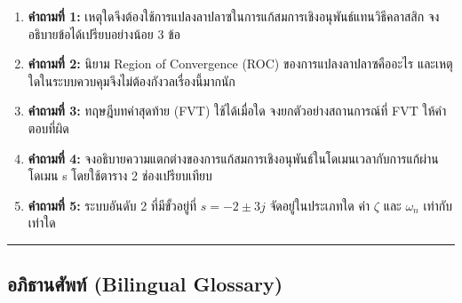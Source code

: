\begin{enumerate}
\def\labelenumi{\arabic{enumi}.}
\tightlist
\item
  \textbf{คำถามที่ 1:}
  เหตุใดจึงต้องใช้การแปลงลาปลาซในการแก้สมการเชิงอนุพันธ์แทนวิธีคลาสสิก
  จงอธิบายข้อได้เปรียบอย่างน้อย 3 ข้อ
\item
  \textbf{คำถามที่ 2:} นิยาม Region of Convergence (ROC)
  ของการแปลงลาปลาซคืออะไร และเหตุใดในระบบควบคุมจึงไม่ต้องกังวลเรื่องนี้มากนัก
\item
  \textbf{คำถามที่ 3:} ทฤษฎีบทค่าสุดท้าย (FVT) ใช้ได้เมื่อใด จงยกตัวอย่างสถานการณ์ที่
  FVT ให้คำตอบที่ผิด
\item
  \textbf{คำถามที่ 4:}
  จงอธิบายความแตกต่างของการแก้สมการเชิงอนุพันธ์ในโดเมนเวลากับการแก้ผ่านโดเมน s
  โดยใช้ตาราง 2 ช่องเปรียบเทียบ
\item
  \textbf{คำถามที่ 5:} ระบบอันดับ 2 ที่มีขั้วอยู่ที่ \(s = -2 \pm 3j\) จัดอยู่ในประเภทใด
  ค่า \(\zeta\) และ \(\omega_n\) เท่ากับเท่าใด
\end{enumerate}

\begin{center}\rule{0.5\linewidth}{0.5pt}\end{center}

\newpage

\subsection{อภิธานศัพท์ (Bilingual
Glossary)}\label{uxe2duxe20uxe18uxe32uxe19uxe28uxe1euxe17-bilingual-glossary}


